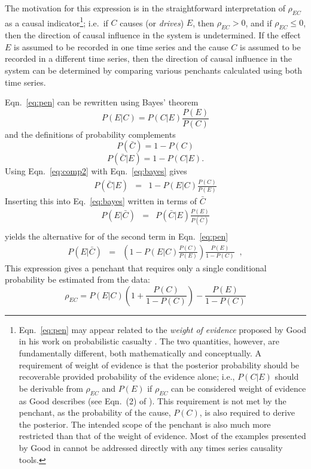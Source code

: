 \documentclass[twocolumn,aps,pre,groupedaddress]{revtex4-1}
\begin{document}
The motivation for this expression is in the straightforward interpretation of $\rho_{EC}$ as a causal indicator\footnote{Eqn.\ \ref{eq:pen} may appear related to the {\em weight of evidence} proposed by Good in his work on probabilistic casualty \cite{Good1984}.  The two quantities, however, are fundamentally different, both mathematically and conceptually.  A requirement of weight of evidence is that the posterior probability should be recoverable provided probability of the evidence alone; i.e., $P(C|E)$ should be derivable from $\rho_{EC}$ and $P(E)$ if $\rho_{EC}$ can be considered weight of evidence as Good describes (see Eqn.\ (2) of \cite{Good1984}).  This requirement is not met by the penchant, as the probability of the cause, $P(C)$, is also required to derive the posterior.  The intended scope of the penchant is also much more restricted than that of the weight of evidence.  Most of the examples presented by Good in \cite{Good1984} cannot be addressed directly with any times series causality tools.}; i.e.\ if $C$ causes (or {\em drives}) $E$, then $\rho_{EC} > 0$, and if $\rho_{EC} \le 0$, then the direction of causal influence in the system is undetermined.  If the effect $E$ is assumed to be recorded in one time series and the cause $C$ is assumed to be recorded in a different time series, then the direction of causal influence in the system can be determined by comparing various penchants calculated using both time series.

Eqn.\ \ref{eq:pen} can be rewritten using Bayes' theorem 
\begin{equation}
\label{eq:bayes}
P(E|C) = P(C|E)\frac{P(E)}{P(C)}
\end{equation}
and the definitions of probability complements
\begin{equation}
\label{eq:comp1}
P(\bar{C}) = 1-P(C)
\end{equation}
\begin{equation}
\label{eq:comp2}
P(\bar{C}|E) = 1-P(C|E).  
\end{equation}
Using Eqn.\ \ref{eq:comp2} with Eqn.\ \ref{eq:bayes} gives 
\begin{eqnarray*}
P(\bar{C}|E) &=& 1-P(E|C)\frac{P(C)}{P(E)}
\end{eqnarray*}
Inserting this into Eq.\ \ref{eq:bayes} written in terms of $\bar{C}$
\begin{eqnarray*}
P(E|\bar{C}) &=& P(\bar{C}|E)\frac{P(E)}{P(\bar{C})}\\
\end{eqnarray*}
yields the alternative for of the second term in Eqn.\ \ref{eq:pen}
\begin{eqnarray*}
P(E|\bar{C}) &=&\left(1-P(E|C)\frac{P(C)}{P(E)}\right)\frac{P(E)}{1-P(C)}\;\;,
\end{eqnarray*}
This expression gives a penchant that requires only a single conditional probability be estimated from the data:
\begin{equation}
\label{eq:pencal}
\rho_{EC} = P(E|C)\left(1+\frac{P(C)}{1-P(C)}\right)-\frac{P(E)}{1-P(C)}
\end{equation}
\end{document}
